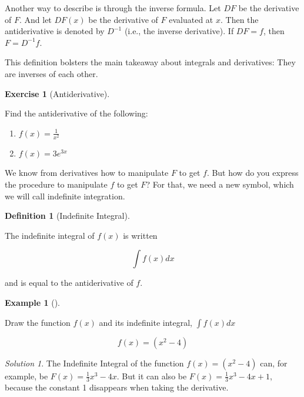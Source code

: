 \documentclass[
  letterpaper,
]{book}
\providecommand{\tightlist}{%
  \setlength{\itemsep}{0pt}\setlength{\parskip}{0pt}}\usepackage{longtable,booktabs,array}
\theoremstyle{definition}
\newtheorem{definition}{Definition}[chapter]
\theoremstyle{definition}
\newtheorem{example}{Example}[chapter]
\theoremstyle{plain}
\theoremstyle{definition}
\newtheorem{exercise}{Exercise}[chapter]
\theoremstyle{plain}
\theoremstyle{plain}
\theoremstyle{remark}
\newtheorem*{solution}{Solution}
\begin{document}
Another way to describe is through the inverse formula. Let \(DF\) be
the derivative of \(F\). And let \(DF(x)\) be the derivative of \(F\)
evaluated at \(x\). Then the antiderivative is denoted by \(D^{-1}\)
(i.e., the inverse derivative). If \(DF=f\), then \(F=D^{-1}f\).

This definition bolsters the main takeaway about integrals and
derivatives: They are inverses of each other.

\leavevmode{}%
\begin{exercise}[Antiderivative]\label{exr-}

Find the antiderivative of the following:

\begin{enumerate}
\def\labelenumi{\arabic{enumi}.}
\tightlist
\item
  \(f(x) = \frac{1}{x^2}\)
\item
  \(f(x) = 3e^{3x}\)
\end{enumerate}

\end{exercise}

We know from derivatives how to manipulate \(F\) to get \(f\). But how
do you express the procedure to manipulate \(f\) to get \(F\)? For that,
we need a new symbol, which we will call indefinite integration.

\leavevmode{}%
\begin{definition}[Indefinite Integral]\label{def-}

The indefinite integral of \(f(x)\) is written

\[\int f(x) dx \]

and is equal to the antiderivative of \(f\).

\end{definition}

\leavevmode{}%
\begin{example}[]\label{exm-}

Draw the function \(f(x)\) and its indefinite integral,
\(\int\limits f(x) dx\)

\[f(x) = (x^2-4)\]

\end{example}

\begin{solution}

The Indefinite Integral of the function \(f(x) = (x^2-4)\) can, for
example, be \(F(x) = \frac{1}{3}x^3 - 4x.\) But it can also be
\(F(x) = \frac{1}{3}x^3 - 4x + 1\), because the constant 1 disappears
when taking the derivative.

\end{solution}
\end{document}
